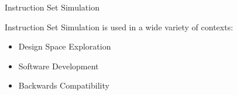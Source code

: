 \begin{frame}[t]{Instruction Set Simulation}
\vspace{0pt}
\begin{minipage}{\textwidth}
	\vspace{0pt}
	Instruction Set Simulation is used in a wide variety of contexts:
	\begin{itemize}
		\item<2-> Design Space Exploration
		\item<3-> Software Development 
		\item<4-> Backwards Compatibility
	\end{itemize}
\end{minipage}

\bigskip


\end{frame}
